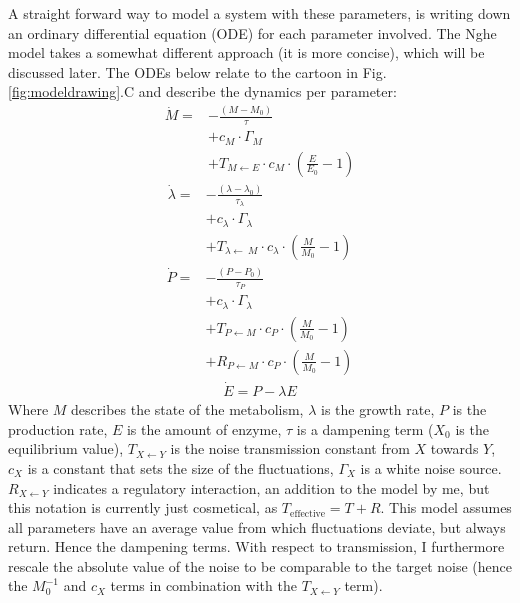 A straight forward way to model a system with these parameters, is writing down an ordinary differential equation (ODE) for each parameter involved. 
%
The Nghe model takes a somewhat different approach (it is more concise), which will be discussed later.
%
The ODEs below relate to the cartoon in Fig. \ref{fig:modeldrawing}.C
and describe the dynamics per parameter:
%
\begin{align}
\label{myfirstequation}
\dot{M} = & - \frac{(M-M_0)}{\tau}  \nonumber \\ 
          & + c_M \cdot \Gamma_M  \nonumber \\ %
          & + T_{M\leftarrow E} \cdot c_M \cdot (\frac{E}{E_0} - 1)  
\end{align}
%
%
\begin{align}
	\dot{\lambda} = & -\frac{(\lambda - \lambda_0 )}{\tau_\lambda} \nonumber \\ 
 			& + c_\lambda \cdot \Gamma_\lambda \nonumber \\  %
			& +    T_{\lambda\leftarrow\ M} \cdot c_\lambda \cdot (\frac{M}{M_0}-1) 
\end{align}
%
\begin{align}
\label{mythirdequation}
\dot{P} = & - \frac{(P-P_0)}{\tau_P} \nonumber \\ 
		 & + c_\lambda \cdot \Gamma_\lambda \nonumber \\ 
         & + T_{P\leftarrow M} \cdot c_P \cdot (\frac{M}{M_0}-1)  \nonumber \\ 
         & + R_{P\leftarrow M} \cdot c_P \cdot (\frac{M}{M_0}-1)
\end{align}
%
\begin{align}
\label{mylastequation}
\dot{E} = P - \lambda E
\end{align}
%
Where $M$ describes the state of the metabolism, $\lambda$ is the growth rate, $P$ is the production rate, $E$ is the amount of enzyme, $\tau$ is a dampening term ($X_0$ is the equilibrium value), $T_{X \leftarrow Y}$ is the noise transmission constant from $X$ towards $Y$, $c_X$ is a constant that sets the size of the fluctuations, $\Gamma_X$ is a white noise source.
$R_{X \leftarrow Y}$ indicates a regulatory interaction, an addition to the model by me, but this notation is currently just cosmetical, as $T_\text{effective}=T+R$.
%
This model assumes all parameters have an average value from which fluctuations deviate, but always return. Hence the dampening terms.
With respect to transmission, I furthermore rescale the absolute value of the noise to be comparable to the target noise (hence the $M_0^{-1}$ and $c_X$ terms in combination with the $T_{X\leftarrow Y}$ term).

